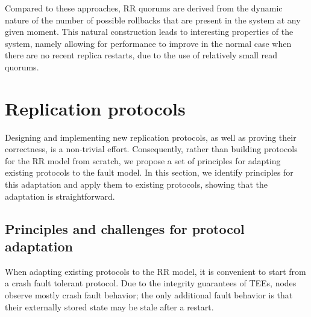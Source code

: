
Compared to these approaches, \ac{RR} quorums are derived from
the dynamic nature of the number of possible rollbacks that are present in the
system at any given moment.
This natural construction leads to interesting properties of the
system, namely allowing for performance to improve in the normal case
when there are no recent replica restarts, due to the use of relatively
small read quorums.

\section{Replication protocols}\label{sec:protocol}

Designing and implementing new replication protocols, as well as
proving their correctness, is a non-trivial effort. Consequently,
rather than building protocols for the \ac{RR} model from
scratch, we propose a set of principles for adapting existing
protocols to the fault model.
In this section, we identify principles for this adaptation and apply
them to existing protocols, showing that the adaptation is
straightforward.

\subsection{Principles and challenges for protocol adaptation}

When adapting existing protocols to the \ac{RR} model, it is
convenient to start from a crash fault tolerant protocol.
Due to the integrity guarantees of \acp{TEE}, nodes observe mostly crash
fault behavior; the only additional fault behavior is that their
externally stored state may be stale after a restart.

